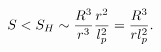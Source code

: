 \begin{equation}
S<S_{H}\sim \frac{R^{3}}{r^{3}}\frac{r^{2}}{l_{p}^{2}}=\frac{R^{3}}{%
rl_{p}^{2}}.
\end{equation}

